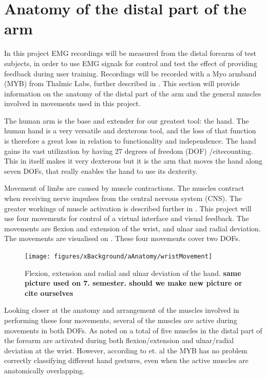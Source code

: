 \section{Anatomy of the distal part of the arm} \label{sec:anatomy}


In this project EMG recordings will be measured from the distal forearm of test subjects, in order to use EMG signals for control and test the effect of providing feedback during user training. Recordings will be recorded with a Myo armband (MYB) from Thalmic Labs, further described in . This section will provide information on the anatomy of the distal part of the arm and the general muscles involved in movements used in this project.

The human arm is the base and extender for our greatest tool: the hand. The human hand is a very versatile and dexterous tool, and the loss of that function is therefore a great loss in relation to functionality and independence. The hand gains its vast utilization by having 27 degrees of freedom (DOF) /cite{counting}. This in itself makes it very dexterous but it is the arm that moves the hand along seven DOFs, that really enables the hand to use its dexterity. \cite{strahinjaKursusSlides2018}

Movement of limbs are caused by muscle contractions. The muscles contract when receiving nerve impulses from the central nervous system (CNS). The greater workings of muscle activation is described further in . This project will use four movements for control of a virtual interface and visual feedback. The movements are flexion and extension of the wrist, and ulnar and radial deviation. The movements are visualised on . These four movements cover two DOFs.

\begin{figure}[H] 
	\texttt{[image: figures/xBackground/aAnatomy/wristMovement]}
	\caption{Flexion, extension and radial and ulnar deviation of the hand. \textbf{same picture used on 7. semester. should we make new picture or cite ourselves}}
	\label{fig:wristMovement}
\end{figure}

Looking closer at the anatomy and arrangement of the muscles involved in performing these four movements, several of the muscles are active during movements in both DOFs. As noted on  a total of five muscles in the distal part of the forearm are activated during both flexion/extension and ulnar/radial deviation at the wrist. However, according to \cite{Mendez2017} et. al the MYB has no problem correctly classifying different hand gestures, even when the active muscles are anatomically overlapping. %

